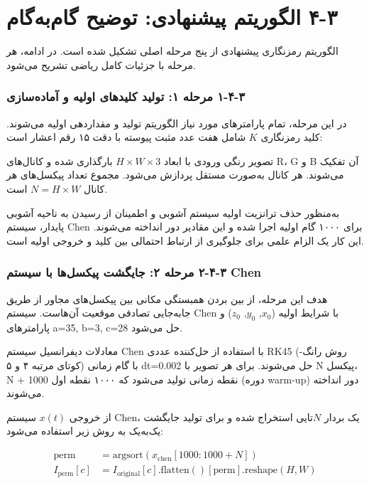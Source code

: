 \section{‏۳‏-‏۴‏ الگوریتم پیشنهادی: توضیح گام‌به‌گام}

الگوریتم رمزنگاری پیشنهادی از پنج مرحله اصلی تشکیل شده است. در ادامه، هر مرحله با جزئیات کامل ریاضی تشریح می‌شود.

\subsubsection{‏۳‏-‏۴‏-‏۱‏ مرحله ۱: تولید کلیدهای اولیه و آماده‌سازی}

در این مرحله، تمام پارامترهای مورد نیاز الگوریتم تولید و مقداردهی اولیه می‌شوند. کلید رمزنگاری $K$ شامل هفت عدد مثبت پیوسته با دقت ۱۵ رقم اعشار است:

تصویر رنگی ورودی با ابعاد $H \times W \times 3$ بارگذاری شده و کانال‌های R، G و B آن تفکیک می‌شوند. هر کانال به‌صورت مستقل پردازش می‌شود. مجموع تعداد پیکسل‌های هر کانال $N = H \times W$ است.

به‌منظور حذف ترانزیت اولیه سیستم آشوبی و اطمینان از رسیدن به ناحیه آشوبی پایدار، سیستم Chen برای ۱۰۰۰ گام اولیه اجرا شده و این مقادیر دور انداخته می‌شوند.  این کار یک الزام علمی برای جلوگیری از ارتباط احتمالی بین کلید و خروجی اولیه است.

\subsubsection{‏۳‏-‏۴‏-‏۲‏ مرحله ۲: جایگشت پیکسل‌ها با سیستم Chen}

هدف این مرحله، از بین بردن همبستگی مکانی بین پیکسل‌های مجاور از طریق جابه‌جایی تصادفی موقعیت آن‌هاست. سیستم Chen با شرایط اولیه ($x_0$, $y_0$, $z_0$) و پارامترهای a=35, b=3, c=28 حل می‌شود.

معادلات دیفرانسیل سیستم Chen با استفاده از حل‌کننده عددی RK45 (روش رانگ-کوتای مرتبه ۴ و ۵) با گام زمانی dt=0.002 حل می‌شوند.  برای هر تصویر با N پیکسل، N + 1000 نقطه زمانی تولید می‌شود که ۱۰۰۰ نقطه اول (دوره warm-up) دور انداخته می‌شوند\cite{ref6}.

از خروجی $x(t)$ سیستم Chen، یک بردار $N$تایی استخراج شده و برای تولید جایگشت یک‌به‌یک به روش زیر استفاده می‌شود:

\begin{align}
\mathrm{perm} &= \mathrm{argsort}\left(x_{\mathrm{chen}}[1000:1000+N]\right) \\
I_{\mathrm{perm}}[c] &= I_{\mathrm{original}}[c].\mathrm{flatten()}[\mathrm{perm}].\mathrm{reshape}(H,W)

\end{align}


